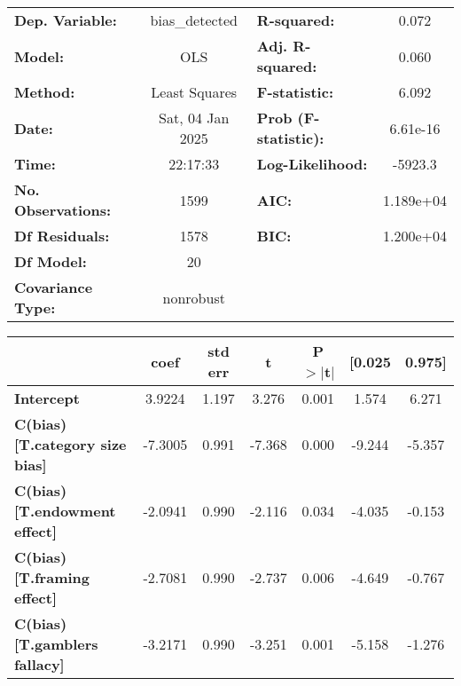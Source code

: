 \begin{center}
\begin{tabular}{lclc}
\toprule
\textbf{Dep. Variable:}                   &  bias\_detected  & \textbf{  R-squared:         } &      0.072   \\
\textbf{Model:}                           &       OLS        & \textbf{  Adj. R-squared:    } &      0.060   \\
\textbf{Method:}                          &  Least Squares   & \textbf{  F-statistic:       } &      6.092   \\
\textbf{Date:}                            & Sat, 04 Jan 2025 & \textbf{  Prob (F-statistic):} &   6.61e-16   \\
\textbf{Time:}                            &     22:17:33     & \textbf{  Log-Likelihood:    } &    -5923.3   \\
\textbf{No. Observations:}                &        1599      & \textbf{  AIC:               } &  1.189e+04   \\
\textbf{Df Residuals:}                    &        1578      & \textbf{  BIC:               } &  1.200e+04   \\
\textbf{Df Model:}                        &          20      & \textbf{                     } &              \\
\textbf{Covariance Type:}                 &    nonrobust     & \textbf{                     } &              \\
\bottomrule
\end{tabular}
\begin{tabular}{lcccccc}
                                          & \textbf{coef} & \textbf{std err} & \textbf{t} & \textbf{P$> |$t$|$} & \textbf{[0.025} & \textbf{0.975]}  \\
\midrule
\textbf{Intercept}                        &       3.9224  &        1.197     &     3.276  &         0.001        &        1.574    &        6.271     \\
\textbf{C(bias)[T.category size bias]}    &      -7.3005  &        0.991     &    -7.368  &         0.000        &       -9.244    &       -5.357     \\
\textbf{C(bias)[T.endowment effect]}      &      -2.0941  &        0.990     &    -2.116  &         0.034        &       -4.035    &       -0.153     \\
\textbf{C(bias)[T.framing effect]}        &      -2.7081  &        0.990     &    -2.737  &         0.006        &       -4.649    &       -0.767     \\
\textbf{C(bias)[T.gamblers fallacy]}      &      -3.2171  &        0.990     &    -3.251  &         0.001        &       -5.158    &       -1.276     \\

\end{tabular}
\end{center}
